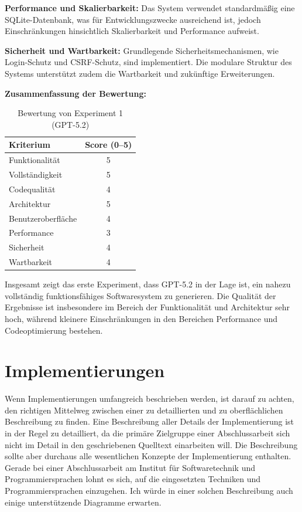\textbf{Performance und Skalierbarkeit:}
Das System verwendet standardmäßig eine SQLite-Datenbank,
was für Entwicklungszwecke ausreichend ist, jedoch
Einschränkungen hinsichtlich Skalierbarkeit und
Performance aufweist.

\textbf{Sicherheit und Wartbarkeit:}
Grundlegende Sicherheitsmechanismen, wie Login-Schutz
und CSRF-Schutz, sind implementiert. Die modulare
Struktur des Systems unterstützt zudem die Wartbarkeit
und zukünftige Erweiterungen.

\textbf{Zusammenfassung der Bewertung:}

\begin{table}[h]
\centering
\begin{tabular}{lc}
\hline
\textbf{Kriterium} & \textbf{Score (0–5)} \\
\hline
Funktionalität & 5 \\
Vollständigkeit & 5 \\
Codequalität & 4 \\
Architektur & 5 \\
Benutzeroberfläche & 4 \\
Performance & 3 \\
Sicherheit & 4 \\
Wartbarkeit & 4 \\
\hline
\end{tabular}
\caption{Bewertung von Experiment 1 (GPT-5.2)}
\end{table}

Insgesamt zeigt das erste Experiment, dass GPT-5.2 in
der Lage ist, ein nahezu vollständig funktionsfähiges
Softwaresystem zu generieren. Die Qualität der Ergebnisse
ist insbesondere im Bereich der Funktionalität und
Architektur sehr hoch, während kleinere Einschränkungen
in den Bereichen Performance und Codeoptimierung bestehen.

\section{Implementierungen}

Wenn Implementierungen umfangreich beschrieben werden, ist darauf zu achten, den richtigen Mittelweg zwischen einer zu detaillierten und zu oberflächlichen Beschreibung zu finden. Eine Beschreibung aller Details der Implementierung ist in der Regel zu detailliert, da die primäre Zielgruppe einer Abschlussarbeit sich nicht im Detail in den geschriebenen Quelltext einarbeiten will. Die Beschreibung sollte aber durchaus alle wesentlichen Konzepte der Implementierung enthalten. Gerade bei einer Abschlussarbeit am Institut für Softwaretechnik und Programmiersprachen lohnt es sich, auf die eingesetzten Techniken und Programmiersprachen einzugehen. Ich würde in einer solchen Beschreibung auch einige unterstützende Diagramme erwarten.

